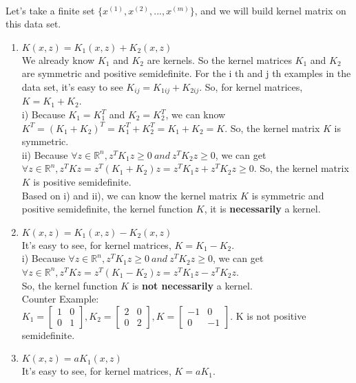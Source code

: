 \begin{answer}\\
Let's take a finite set $\{x^{(1)}, x^{(2)}, ..., x^{(m)}\}$, and we will build kernel matrix on this data set. 
\begin{enumerate}
\item $K(x,z) = K_1(x,z) + K_2(x,z)$\\ 
We already know $K_1$ and $K_2$ are kernels. So the kernel matrices $K_1$ and $K_2$ are symmetric and positive semidefinite.
For the i th and j th examples in the data set, it's easy to see $K_{ij} = K_{1 ij}+K_{2 ij}$. So, for kernel matrices, $K = K_1 + K_2$.\\
i) Because $K_1 = K_1^T$ and $K_2 = K_2^T$, we can know $K^T = (K_1 + K_2)^T = K_1^T + K_2^T = K_1 + K_2 = K$. So, the kernel matrix $K$ is symmetric.\\
ii) Because $\forall z \in \mathbb{R}^n, z^T K_1 z \geq 0\ and\ z^T K_2 z \geq 0$, we can get $\forall z \in \mathbb{R}^n, z^T K z = z^T (K_1 + K_2) z = z^T K_1 z + z^T K_2 z \geq 0$. So, the kernel matrix $K$ is positive semidefinite.\\
Based on i) and ii), we can know the kernel matrix $K$ is symmetric and positive semidefinite, the kernel function $K$, it is \textbf{necessarily} a kernel.
\item $K(x,z) = K_1(x,z) - K_2(x,z)$\\
It's easy to see, for kernel matrices, $K = K_1 - K_2$.\\
i) Because $\forall z \in \mathbb{R}^n, z^T K_1 z \geq 0\ and\ z^T K_2 z \geq 0$, we can get $\forall z \in \mathbb{R}^n, z^T K z = z^T (K_1 - K_2) z = z^T K_1 z - z^T K_2 z$.\\
So, the kernel function $K$ is \textbf{not necessarily} a kernel.\\
Counter Example:\\
$K_1 = \begin{bmatrix}1 & 0 \\ 0 & 1\end{bmatrix}, K_2 = \begin{bmatrix}2 & 0 \\ 0 & 2\end{bmatrix}, K = \begin{bmatrix}-1 & 0 \\ 0 & -1\end{bmatrix}$. K is not positive semidefinite.
\item $K(x,z) = a K_1(x,z)$\\
It's easy to see, for kernel matrices, $K = a K_1$.\\

\end{enumerate}
\end{answer}
